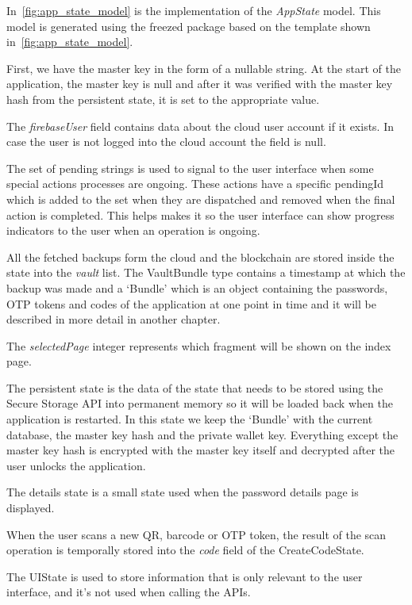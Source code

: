 \documentclass[a4paper,12pt]{report}
\begin{document}
In~\autoref{fig:app_state_model} is the implementation of the \textit{AppState}
model. This model is generated using the freezed package based on the template
shown in~\autoref{fig:app_state_model}.

First, we have the master key in the form of a nullable string. At the start of
the application, the master key is null and after it was verified with the
master key hash from the persistent state, it is set to the appropriate value.

The \textit{firebaseUser} field contains data about the cloud user account if
it exists. In case the user is not logged into the cloud account the field is
null.

The set of pending strings is used to signal to the user interface when some
special actions processes are ongoing. These actions have a specific pendingId
which is added to the set when they are dispatched and removed when the final
action is completed. This helps makes it so the user interface can show
progress indicators to the user when an operation is ongoing.

All the fetched backups form the cloud and the blockchain are stored inside the
state into the \textit{vault} list. The VaultBundle type contains a timestamp
at which the backup was made and a `Bundle' which is an object containing the
passwords, OTP tokens and codes of the application at one point in time and it
will be described in more detail in another chapter.

The \textit{selectedPage} integer represents which fragment will be shown on
the index page.

The persistent state is the data of the state that needs to be stored using the
Secure Storage API into permanent memory so it will be loaded back when the
application is restarted. In this state we keep the `Bundle' with the current
database, the master key hash and the private wallet key. Everything except the
master key hash is encrypted with the master key itself and decrypted after the
user unlocks the application.

The details state is a small state used when the password details page is
displayed.

When the user scans a new QR, barcode or OTP token, the result of the scan
operation is temporally stored into the \textit{code} field of the
CreateCodeState.

The UIState is used to store information that is only relevant to the user
interface, and it's not used when calling the APIs.
\end{document}

